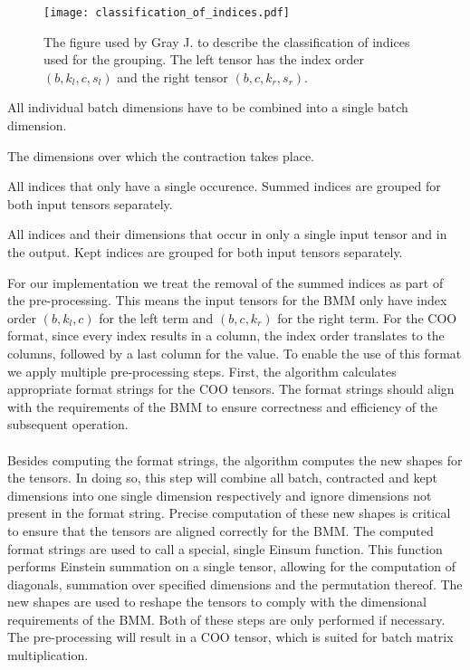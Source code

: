 \begin{figure}[H]
    \centering
    \texttt{[image: classification\_of\_indices.pdf]}
    \caption{The figure used by Gray J. \cite{jcmgray}  to describe the classification of indices
        used for the grouping. The left tensor has the index order $(b, k_l, c, s_l)$ and the right
        tensor $(b, c, k_r, s_r)$.}
    \label{fig:bmm:template}
\end{figure}
%
\begin{description}[leftmargin=!,labelwidth=\widthof{\bfseries Contracted Indices (c)}]
    \item [Batch Indices (b)] All individual batch dimensions have to be combined into a single
          batch dimension.
    \item [Contracted Indices (c)] The dimensions over which the contraction takes place.
    \item [Summed Indices (s)] All indices that only have a single occurence. Summed indices are 
          grouped for both input tensors separately.
    \item [Kept Indices (k)] All indices and their dimensions that occur in only a single input
          tensor and in the output. Kept indices are grouped for both input tensors separately.
\end{description}
%
For our implementation we treat the removal of the summed indices as part of the pre-processing.
This means the input tensors for the BMM only have index order $(b, k_l, c)$ for the left term and
$(b, c, k_r)$ for the right term. For the COO format, since every index results in a column,
the index order translates to the columns, followed by a last column for the value. To enable the use
of this format we apply multiple pre-processing steps. First, the algorithm calculates appropriate
format strings for the COO tensors. The format strings should align with the requirements of the BMM
to ensure correctness and efficiency of the subsequent operation.
\\
\\
Besides computing the format strings, the algorithm computes the new shapes for the tensors.
In doing so, this step will combine all batch, contracted and kept dimensions into one single dimension
respectively and ignore dimensions not present in the format string. Precise computation of these new
shapes is critical to ensure that the tensors are aligned correctly for the BMM. The computed format strings are used to call a special, single Einsum function. This function performs
Einstein summation on a single tensor, allowing for the computation of diagonals, summation over
specified dimensions and the permutation thereof. The new shapes are used to reshape the tensors to
comply with the dimensional requirements of the BMM. Both of these steps are only performed if necessary.
The pre-processing will result in a COO tensor, which is suited for batch matrix multiplication.

